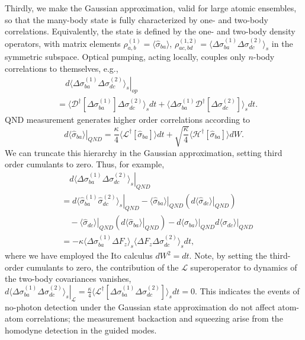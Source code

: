 \documentclass[aps,pra,twocolumn,superscriptaddress]{revtex4-1} %
\newcommand{\nn}{\nonumber}
\newcommand{\expect}[1]{\big\langle #1 \big\rangle}
\begin{document}
Thirdly, we make the Gaussian approximation, valid for large atomic ensembles, so that the many-body state is fully characterized by one- and two-body correlations. Equivalently, the state is defined by the one- and two-body density operators, with matrix elements $\rho^{(1)}_{a, b} =\expect{\hat{\sigma}_{ba}}$, $\rho^{(1,2)}_{ac,bd}=\expect{\Delta \sigma_{ba}^{(1)}\Delta\sigma_{dc}^{(2)} }_s$ in the symmetric subspace.   Optical pumping, acting locally, couples only $n$-body correlations to themselves, e.g.,
\begin{align}
&\quad\left.d\expect{\!\Delta \sigma_{ba}^{(1)}\Delta\sigma_{dc}^{(2)} }_s\right|_{op} \nn\\
&= \expect{\mathcal{D}^\dagger[\Delta \sigma_{ba}^{(1)}]\Delta\sigma_{dc}^{(2)} }_sdt + \expect{\Delta \sigma_{ba}^{(1)} \mathcal{D}^\dagger[\Delta\sigma_{dc}^{(2)}] }_sdt .\label{eq:dsigmabadc_op}
\end{align}
QND measurement generates higher order correlations according to
\begin{equation}\label{eq:dsigmaba_QND}
\left.d\expect{\hat{\sigma}_{ba}}\right|_{QND} =\frac{\kappa}{4}\expect{\mathcal{L}^\dagger\left[\hat{\sigma}_{ba} \right]}dt + \sqrt{\frac{\kappa}{4}}\expect{\mathcal{H}^\dagger\left[\hat{\sigma}_{ba} \right]}dW .
\end{equation}
We can truncate this hierarchy in the Gaussian approximation, setting third order cumulants to zero.  Thus, for example,
\begin{align}
&\quad\left.d\expect{\Delta \sigma_{ba}^{(1)} \Delta \sigma_{dc}^{(2)}}_s \right|_{QND}\nn\\
&= \left.d\expect{\hat{\sigma}_{ba}^{(1)} \hat{\sigma}_{dc}^{(2)}}_s \right|_{QND} - \left. \expect{\hat{\sigma}_{ba}} \right|_{QND} \left( \left.d\expect{\hat{\sigma}_{dc}} \right|_{QND}\right) \nonumber\\
&\quad -\! \left. \expect{\!\hat{\sigma}_{dc}\!}\! \right|_{QN\!D} \left(\! \left.d\expect{\!\hat{\sigma}_{ba}\!} \!\right|_{QN\!D}\!\right)
\!-\! \left.d\expect{\!\sigma_{ba}\!} \!\right|_{QN\!D}\left.d\expect{\sigma_{dc}} \right|_{QN\!D} \nonumber \\
&= -\kappa\expect{\Delta \sigma^{(1)}_{ba}  \Delta F_z }_s \expect{\Delta F_z \Delta \sigma_{dc}^{(2)} }_sdt,\label{eq:dsigmabadc_QND}
\end{align}
where we have employed the Ito calculus $dW^2 = dt$.
Note, by setting the third-order cumulants to zero,  the contribution of the $\mathcal{L}$ superoperator to dynamics of the two-body covariances vanishes,  $ \left.d\expect{\Delta \sigma_{ba}^{(1)} \Delta \sigma_{dc}^{(2)}}_s\right|_\mathcal{L} =\frac{\kappa}{4}\expect{\mathcal{L}^\dagger\left[\Delta\sigma_{ba}^{(1)}\Delta\sigma_{dc}^{(2)} \right]}_sdt=0 $.  This indicates the events of no-photon detection under the Gaussian state approximation do not affect atom-atom correlations;  the measurement backaction and squeezing arise from the homodyne detection in the guided modes.
\end{document}
